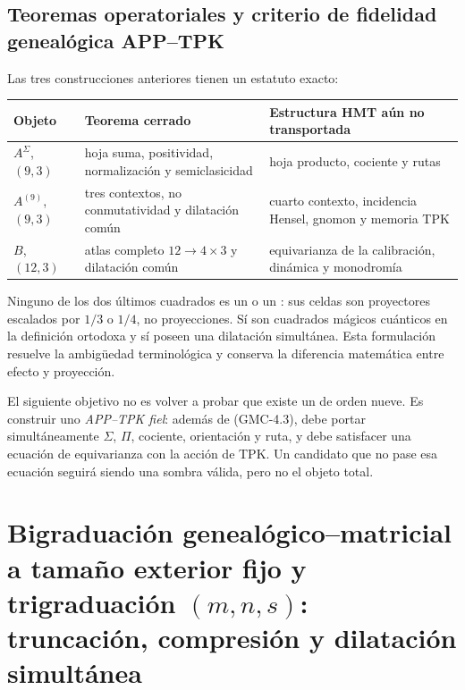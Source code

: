 \subsection{Teoremas operatoriales y criterio de fidelidad genealógica APP--TPK}

Las tres construcciones anteriores tienen un estatuto exacto:

\begin{center}
\begin{tabularx}{.96\textwidth}{@{}L{.20\textwidth}L{.21\textwidth}Y@{}}
\toprule
Objeto & Teorema cerrado & Estructura HMT aún no transportada\\
\midrule
$A^\Sigma$, $(9,3)$ & hoja suma, positividad, normalización y
semiclasicidad & hoja producto, cociente y rutas\\
$A^{(9)}$, $(9,3)$ & tres contextos, no conmutatividad y dilatación común &
cuarto contexto, incidencia Hensel, gnomon y memoria TPK\\
$B$, $(12,3)$ & atlas completo $12\to4\times3$ y dilatación común &
equivarianza de la calibración, dinámica y monodromía\\
\bottomrule
\end{tabularx}
\end{center}

Ninguno de los dos últimos cuadrados es un \QLS o un \QPM: sus celdas son
proyectores escalados por $1/3$ o $1/4$, no proyecciones. Sí son cuadrados
mágicos cuánticos en la definición ortodoxa y sí poseen una dilatación
simultánea. Esta formulación resuelve la ambigüedad terminológica y conserva
la diferencia matemática entre efecto y proyección.

\begin{workbox}
El siguiente objetivo no es volver a probar que existe un \QMS de orden
nueve. Es construir uno \emph{APP--TPK fiel}: además de \textup{(GMC-4.3)}, debe
portar simultáneamente $\Sigma$, $\Pi$, cociente, orientación y ruta, y debe
satisfacer una ecuación de equivarianza con la acción de TPK. Un candidato
que no pase esa ecuación seguirá siendo una sombra válida, pero no el objeto
total.
\end{workbox}


\section[Bigraduación genealógico--matricial]{Bigraduación
genealógico--matricial a tamaño exterior fijo y trigraduación
\texorpdfstring{$(m,n,s)$}{(m,n,s)}: truncación, compresión y dilatación
simultánea}
\label{p12-83-c22-s4:gmc:chap:bigraduacion}

